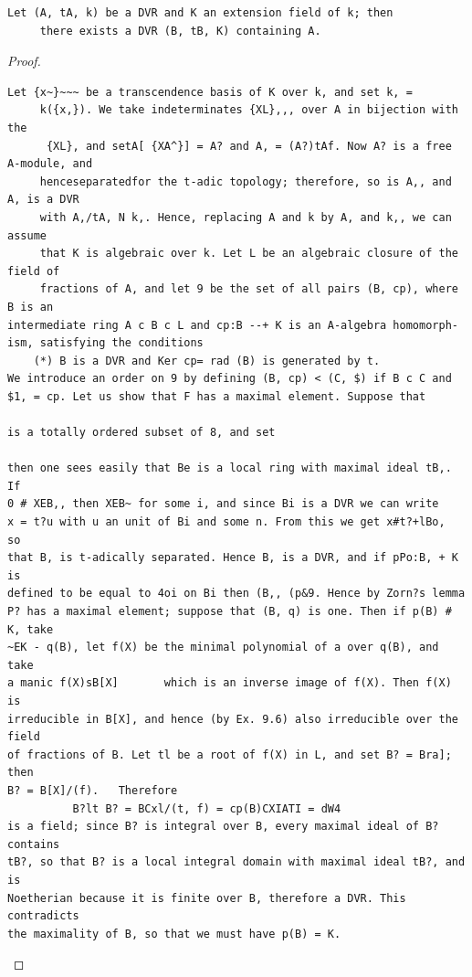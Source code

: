 \begin{theorem}\label{mcrt-auto-theorem-29-1}\uses{}
\begin{verbatim}
Let (A, tA, k) be a DVR and K an extension field of k; then
     there exists a DVR (B, tB, K) containing A.
\end{verbatim}
\end{theorem}
\begin{proof}
\begin{verbatim}
Let {x~}~~~ be a transcendence basis of K over k, and set k, =
     k({x,}). We take indeterminates {XL},,, over A in bijection with the
      {XL}, and setA[ {XA^}] = A? and A, = (A?)tAf. Now A? is a free A-module, and
     henceseparatedfor the t-adic topology; therefore, so is A,, and A, is a DVR
     with A,/tA, N k,. Hence, replacing A and k by A, and k,, we can assume
     that K is algebraic over k. Let L be an algebraic closure of the field of
     fractions of A, and let 9 be the set of all pairs (B, cp), where B is an
intermediate ring A c B c L and cp:B --+ K is an A-algebra homomorph-
ism, satisfying the conditions
    (*) B is a DVR and Ker cp= rad (B) is generated by t.
We introduce an order on 9 by defining (B, cp) < (C, $) if B c C and
$1, = cp. Let us show that F has a maximal element. Suppose that

is a totally ordered subset of 8, and set

then one sees easily that Be is a local ring with maximal ideal tB,. If
0 # XEB,, then XEB~ for some i, and since Bi is a DVR we can write
x = t?u with u an unit of Bi and some n. From this we get x#t?+lBo,        so
that B, is t-adically separated. Hence B, is a DVR, and if pPo:B, + K is
defined to be equal to 4oi on Bi then (B,, (p&9. Hence by Zorn?s lemma
P? has a maximal element; suppose that (B, q) is one. Then if p(B) # K, take
~EK - q(B), let f(X) be the minimal polynomial of a over q(B), and take
a manic f(X)sB[X]       which is an inverse image of f(X). Then f(X) is
irreducible in B[X], and hence (by Ex. 9.6) also irreducible over the field
of fractions of B. Let tl be a root of f(X) in L, and set B? = Bra]; then
B? = B[X]/(f).   Therefore
          B?lt B? = BCxl/(t, f) = cp(B)CXIATI = dW4
is a field; since B? is integral over B, every maximal ideal of B? contains
tB?, so that B? is a local integral domain with maximal ideal tB?, and is
Noetherian because it is finite over B, therefore a DVR. This contradicts
the maximality of B, so that we must have p(B) = K.
\end{verbatim}
\end{proof}


